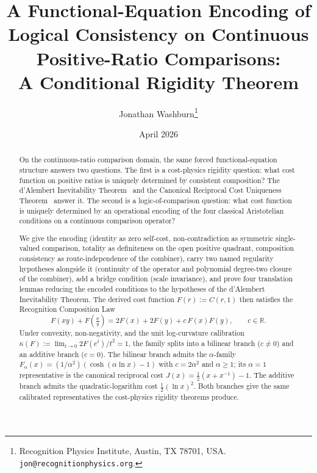 \documentclass[11pt,a4paper]{article}
\title{A Functional-Equation Encoding of Logical Consistency on Continuous
Positive-Ratio Comparisons:\\
A Conditional Rigidity Theorem}
\author{Jonathan Washburn\thanks{Recognition Physics Institute, Austin, TX 78701, USA.\\
\texttt{jon@recognitionphysics.org}.}}
\date{April 2026}
\theoremstyle{definition}
\theoremstyle{remark}
\begin{document}
\maketitle

\begin{abstract}
On the continuous-ratio comparison domain, the same forced
functional-equation structure answers two questions. The first is a
cost-physics rigidity question: what cost function on positive ratios
is uniquely determined by consistent composition? The d'Alembert
Inevitability Theorem~\cite{WashburnZlatanovicAllahyarov2026} and the
Canonical Reciprocal Cost Uniqueness
Theorem~\cite{WashburnZlatanovic2026} answer it. The second is a
logic-of-comparison question: what cost function is uniquely
determined by an operational encoding of the four classical
Aristotelian conditions on a continuous comparison operator?

We give the encoding (identity as zero self-cost, non-contradiction as
symmetric single-valued comparison, totality as definiteness on the
open positive quadrant, composition consistency as route-independence
of the combiner), carry two named regularity hypotheses alongside it
(continuity of the operator and polynomial degree-two closure of the
combiner), add a bridge condition (scale invariance), and prove four
translation lemmas reducing the encoded conditions to the hypotheses
of the d'Alembert Inevitability Theorem. The derived cost function
$F(r) := C(r,1)$ then satisfies the Recognition Composition Law
\[
F(xy) + F\!\left(\tfrac{x}{y}\right) = 2F(x) + 2F(y) + c\,F(x)F(y),
\qquad c \in \mathbb{R}.
\]
Under convexity, non-negativity, and the unit log-curvature calibration
$\kappa(F) := \lim_{t \to 0} 2F(e^t)/t^2 = 1$, the family splits into a
bilinear branch ($c \neq 0$) and an additive branch ($c = 0$). The
bilinear branch admits the $\alpha$-family $F_\alpha(x) = (1/\alpha^2)
(\cosh(\alpha \ln x) - 1)$ with $c = 2\alpha^2$ and $\alpha \geq 1$;
its $\alpha = 1$ representative is the canonical reciprocal cost
$J(x) = \tfrac{1}{2}(x + x^{-1}) - 1$. The additive branch admits the
quadratic-logarithm cost $\tfrac{1}{2}(\ln x)^2$. Both branches give
the same calibrated representatives the cost-physics rigidity theorems
produce.


\end{abstract}
\end{document}
